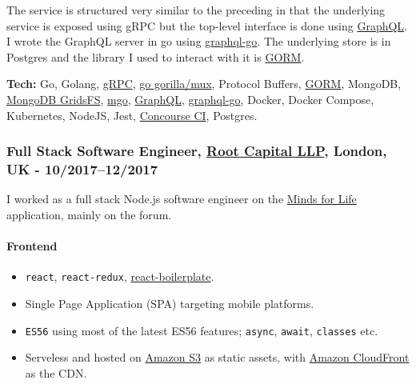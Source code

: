\documentclass[
  a4paper,
]{article}
\providecommand{\tightlist}{%
  \setlength{\itemsep}{0pt}\setlength{\parskip}{0pt}}
\begin{document}
The service is structured very similar to the preceding in that the
underlying service is exposed using gRPC but the top-level interface is
done using \href{graphql.org}{GraphQL}. I wrote the GraphQL server in go
using \href{https://github.com/graph-gophers/graphql-go}{graphql-go}.
The underlying store is in Postgres and the library I used to interact
with it is \href{http://gorm.io/}{GORM}.

\textbf{Tech:} Go, Golang, \href{https://grpc.io/}{gRPC},
\href{https://github.com/gorilla/mux}{go gorilla/mux}, Protocol Buffers,
\href{http://gorm.io/}{GORM}, MongoDB,
\href{https://docs.mongodb.com/manual/core/gridfs/}{MongoDB GridsFS},
\href{https://gopkg.in/mgo.v2}{mgo}, \href{graphql.org}{GraphQL},
\href{https://github.com/graph-gophers/graphql-go}{graphql-go}, Docker,
Docker Compose, Kubernetes, NodeJS, Jest,
\href{https://concourse-ci.org/}{Concourse CI}, Postgres.

\hypertarget{full-stack-software-engineer-root-capital-llp-london-uk---102017122017}{%
\subsubsection{\texorpdfstring{Full Stack Software Engineer,
\href{https://www.rootcapital.co.uk}{Root Capital LLP}, London, UK -
10/2017--12/2017}{Full Stack Software Engineer, Root Capital LLP, London, UK - 10/2017--12/2017}}\label{full-stack-software-engineer-root-capital-llp-london-uk---102017122017}}

I worked as a full stack Node.js software engineer on the
\href{https://mindsforlife.com/}{Minds for Life} application, mainly on
the forum.

\hypertarget{frontend}{%
\paragraph{Frontend}\label{frontend}}

\begin{itemize}
\tightlist
\item
  \texttt{react}, \texttt{react-redux},
  \href{https://www.reactboilerplate.com/}{react-boilerplate}.
\item
  Single Page Application (SPA) targeting mobile platforms.
\item
  \texttt{ES56} using most of the latest ES56 features; \texttt{async},
  \texttt{await}, \texttt{classes} etc.
\item
  Serveless and hosted on \href{https://aws.amazon.com/s3/}{Amazon S3}
  as static assets, with \href{http://aws.amazon.com/cloudfront/}{Amazon
  CloudFront} as the CDN.
\end{itemize}
\end{document}
